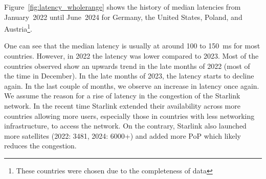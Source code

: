 Figure~\ref{fig:latency_wholerange} shows the history of median latencies from
January~2022 until June~2024 for Germany, the United States, Poland, and
Austria\footnote{These countries were chosen due to the completeness of data}.

One can see that the median latency is usually at around 100 to 150~ms for most
countries. However, in 2022 the latency was lower compared to 2023. Most of the
countries observed show an upwards trend in the late months of 2022 (most of
the time in December). In the late months of 2023, the latency starts to
decline again. In the last couple of months, we observe an increase in latency
once again. We assume the reason for a rise of latency in the congestion of the
Starlink network. In the recent time Starlink extended their availability
across more countries allowing more users, especially those in countries with
less networking infrastructure, to access the network. On the contrary,
Starlink also launched more satellites (2022: 3481, 2024: 6000+) and added more
\ac{PoP} which likely reduces the congestion.

